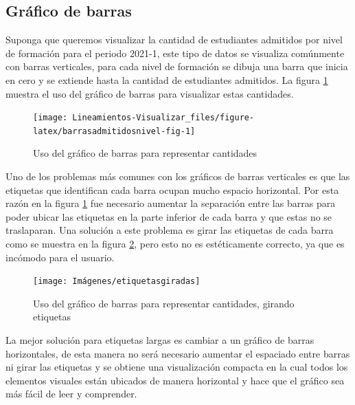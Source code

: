 \documentclass[
]{book}
\begin{document}
\hypertarget{gruxe1fico-de-barras}{%
\subsection{Gráfico de barras}\label{gruxe1fico-de-barras}}

Suponga que queremos visualizar la cantidad de estudiantes admitidos por nivel de formación para el periodo 2021-1, este tipo de datos se visualiza comúnmente con barras verticales, para cada nivel de formación se dibuja una barra que inicia en cero y se extiende hasta la cantidad de estudiantes admitidos. La figura \ref{fig:barrasadmitidosnivel-fig} muestra el uso del gráfico de barras para visualizar estas cantidades.

\begin{figure}

{\centering \texttt{[image: Lineamientos-Visualizar\_files/figure-latex/barrasadmitidosnivel-fig-1]} 

}

\caption{Uso del gráfico de barras para representar cantidades}\label{fig:barrasadmitidosnivel-fig}
\end{figure}

Uno de los problemas más comunes con los gráficos de barras verticales es que las etiquetas que identifican cada barra ocupan mucho espacio horizontal. Por esta razón en la figura \ref{fig:barrasadmitidosnivel-fig} fue necesario aumentar la separación entre las barras para poder ubicar las etiquetas en la parte inferior de cada barra y que estas no se traslaparan. Una solución a este problema es girar las etiquetas de cada barra como se muestra en la figura \ref{fig:barrasadmitidosnivelgirar-fig}, pero esto no es estéticamente correcto, ya que es incómodo para el usuario.

\begin{figure}

{\centering \texttt{[image: Imágenes/etiquetasgiradas]} 

}

\caption{Uso del gráfico de barras para representar cantidades, girando etiquetas}\label{fig:barrasadmitidosnivelgirar-fig}
\end{figure}

La mejor solución para etiquetas largas es cambiar a un gráfico de barras horizontales, de esta manera no será necesario aumentar el espaciado entre barras ni girar las etiquetas y se obtiene una visualización compacta en la cual todos los elementos visuales están ubicados de manera horizontal y hace que el gráfico sea más fácil de leer y comprender.
\end{document}
